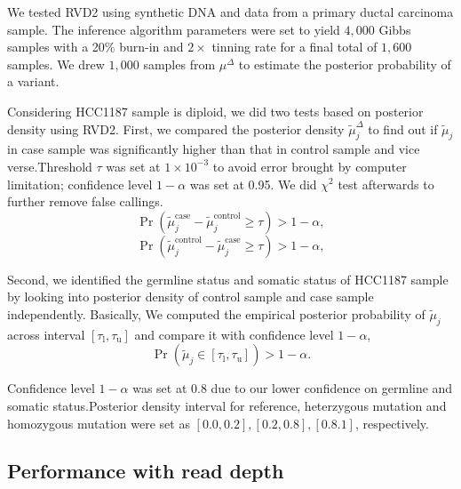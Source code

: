 \documentclass[11pt,reqno]{amsart}
\begin{document}
We tested RVD2 using synthetic DNA and data from a primary ductal carcinoma sample. The inference algorithm parameters were set to yield $4,000$ Gibbs samples with a 20\% burn-in and $2\times$ tinning rate for a final total of $1,600$ samples. We drew $1,000$ samples from $\mu^{\Delta}$ to estimate the posterior probability of a variant.

Considering HCC1187 sample is diploid, we did two tests based on posterior density using RVD2. First, we compared the posterior density $\tilde\mu_j^{\Delta}$ to find out if $\tilde\mu_j$ in case sample was significantly higher than that in control sample and vice verse.Threshold $\tau$ was set at $1\times10^{-3}$ to avoid error brought by computer limitation; confidence level $1-\alpha$ was set at 0.95. We did $\chi^2$ test afterwards to further remove false callings.  %
\begin{equation}\label{eqn:bayes_test_positive}
	\Pr( \tilde{\mu}_j^{\text{case}} - \tilde{\mu}_j^{\text{control}} \geq \tau ) > 1-\alpha,
\end{equation}
\begin{equation}\label{eqn:bayes_test_negative}
	\Pr( \tilde{\mu}_j^{\text{control}} - \tilde{\mu}_j^{\text{case}} \geq \tau ) > 1-\alpha,
\end{equation}


Second, we identified the germline status and somatic status of HCC1187 sample by looking into posterior density of control sample and case sample independently. Basically, We computed the empirical posterior probability of $\tilde\mu_j$ across interval $[\tau_\text{l},\tau_\text{u}]$ and compare it with confidence level $1-\alpha$,
\begin{equation}\label{eqn:bayes_test_interval}
	\Pr( \tilde{\mu}_j \in [\tau_\text{l},\tau_\text{u}] ) > 1-\alpha.
\end{equation}

Confidence level $1-\alpha$ was set at 0.8 due to our lower confidence on germline and somatic status.Posterior density interval for reference, heterzygous mutation and homozygous mutation were set as $[0.0,0.2],[0.2,0.8],[0.8.1]$, respectively.


\subsection{Performance with read depth}\label{sec:read_depth}
\end{document}
